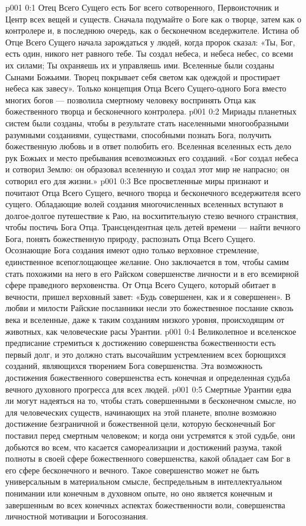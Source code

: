 \author{Божественный Советник}
\vs p001 0:1 Отец Всего Сущего есть Бог всего сотворенного, Первоисточник и Центр всех вещей и существ. Сначала подумайте о Боге как о творце, затем как о контролере и, в последнюю очередь, как о бесконечном вседержителе. Истина об Отце Всего Сущего начала зарождаться у людей, когда пророк сказал: «Ты, Бог, есть один, никого нет равного тебе. Ты создал небеса, и небеса небес, со всеми их силами; Ты охраняешь их и управляешь ими. Вселенные были созданы Сынами Божьими. Творец покрывает себя светом как одеждой и простирает небеса как завесу». Только концепция Отца Всего Сущего\hyp{}одного Бога вместо многих богов --- позволила смертному человеку воспринять Отца как божественного творца и бесконечного контролера.
\vs p001 0:2 Мириады планетных систем были созданы, чтобы в результате стать населенными многообразными разумными созданиями, существами, способными познать Бога, получить божественную любовь и в ответ полюбить его. Вселенная вселенных есть дело рук Божьих и место пребывания всевозможных его созданий. «Бог создал небеса и сотворил Землю: он образовал вселенную и создал этот мир не напрасно; он сотворил его для жизни.»
\vs p001 0:3 Все просветленные миры признают и почитают Отца Всего Сущего, вечного творца и бесконечного вседержителя всего сущего. Обладающие волей создания многочисленных вселенных вступают в долгое\hyp{}долгое путешествие к Раю, на восхитительную стезю вечного странствия, чтобы постичь Бога Отца. Трансцендентная цель детей времени --- найти вечного Бога, понять божественную природу, распознать Отца Всего Сущего. Осознающие Бога создания имеют одно только верховное стремление, единственное всепоглощающее желание. Оно заключается в том, чтобы самим стать похожими на него в его Райском совершенстве личности и в его всемирной сфере праведного верховенства. От Отца Всего Сущего, который обитает в вечности, пришел верховный завет: «Будь совершенен, как и я совершенен». В любви и милости Райские посланники несли это божественное послание сквозь века и вселенные, даже к таким созданиям низкого уровня, происходящим от животных, как человеческие расы Урантии.
\vs p001 0:4 Великолепное и вселенское предписание стремиться к достижению совершенства божественности есть первый долг, и это должно стать высочайшим устремлением всех борющихся созданий, являющихся творением Бога совершенства. Эта возможность достижения божественного совершенства есть конечная и определенная судьба вечного духовного прогресса для всех людей.
\vs p001 0:5 Смертные Урантии едва ли могут надеяться на то, чтобы стать совершенными в бесконечном смысле, но для человеческих существ, начинающих на этой планете, вполне возможно достижение безграничной и божественной цели, которую бесконечный Бог поставил перед смертным человеком; и когда они устремятся к этой судьбе, они добьются во всем, что касается самореализации и достижений разума, такой полноты в своей сфере божественного совершенства, какой обладает сам Бог в его сфере бесконечного и вечного. Такое совершенство может не быть универсальным в материальном смысле, беспредельным в интеллектуальном понимании или конечным в духовном опыте, но оно является конечным и завершенным во всех конечных аспектах божественности воли, совершенства личностной мотивации и Богосознания.
